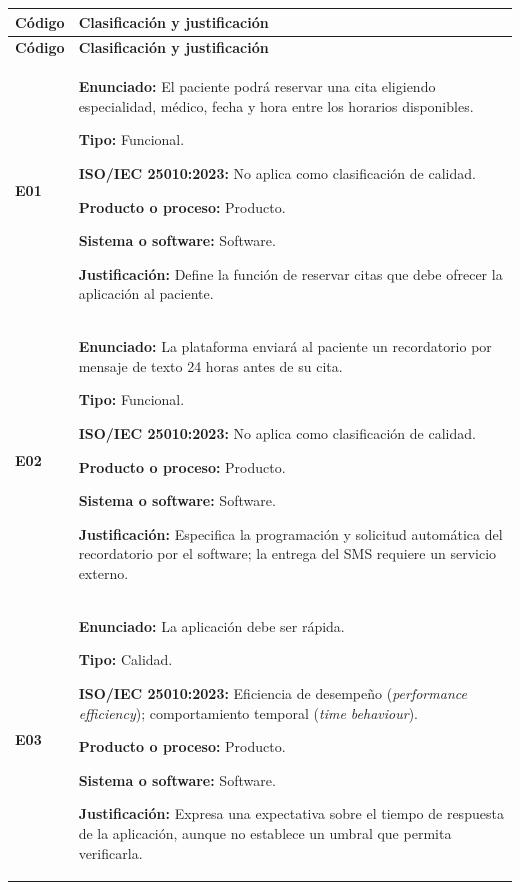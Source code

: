 \documentclass[11pt,a4paper]{article}
\begin{document}
\begin{longtable}{|
    p{}|
    p{}|}

\hline
\rowcolor{gray!15}
\textbf{Código} & \textbf{Clasificación y justificación} \\
\hline
\endfirsthead

\hline
\rowcolor{gray!15}
\textbf{Código} & \textbf{Clasificación y justificación} \\
\hline
\endhead

\textbf{E01} &
\textbf{Enunciado:}
El paciente podrá reservar una cita eligiendo
especialidad, médico, fecha y hora entre los
horarios disponibles.

\textbf{Tipo:} Funcional.

\textbf{ISO/IEC 25010:2023:}
No aplica como clasificación de calidad.

\textbf{Producto o proceso:} Producto.

\textbf{Sistema o software:} Software.

\textbf{Justificación:}
Define la función de reservar citas que debe
ofrecer la aplicación al paciente.
\\
\hline

\textbf{E02} &
\textbf{Enunciado:}
La plataforma enviará al paciente un recordatorio
por mensaje de texto 24 horas antes de su cita.

\textbf{Tipo:} Funcional.

\textbf{ISO/IEC 25010:2023:}
No aplica como clasificación de calidad.

\textbf{Producto o proceso:} Producto.

\textbf{Sistema o software:} Software.

\textbf{Justificación:}
Especifica la programación y solicitud automática
del recordatorio por el software; la entrega
del SMS requiere un servicio externo.
\\
\hline

\textbf{E03} &
\textbf{Enunciado:}
La aplicación debe ser rápida.

\textbf{Tipo:} Calidad.

\textbf{ISO/IEC 25010:2023:}
Eficiencia de desempeño
(\textit{performance efficiency});
comportamiento temporal
(\textit{time behaviour}).

\textbf{Producto o proceso:} Producto.

\textbf{Sistema o software:} Software.

\textbf{Justificación:}
Expresa una expectativa sobre el tiempo de respuesta
de la aplicación, aunque no establece un umbral
que permita verificarla.
\\
\hline


\end{longtable}
\end{document}
